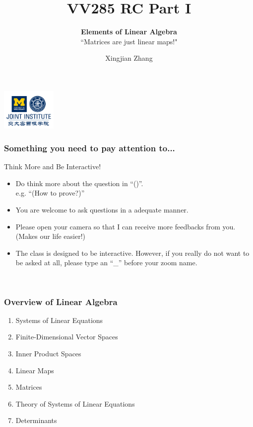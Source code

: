 \documentclass[12pt, t]{beamer}
\title{VV285 RC Part I}
\subtitle{\textbf{Elements of Linear Algebra}\\``Matrices are just linear maps!"}
\institute[UM-SJTU JI]{Univerity of Michigan-Shanghai Jiao Tong University Joint Institute}
\author{Xingjian Zhang}
\begin{document}
\begin{frame}
    \titlepage
    \begin{center}
        \includegraphics[height=2cm]{logo2.png}
    \end{center}
\end{frame}

\begin{frame}
    \frametitle{Something you need to pay attention to...}
    Think More and Be Interactive!
    \begin{itemize}
        \item Do think more about the question in ``()''. \\e.g. ``(How to prove?)''
        \item You are welcome to ask questions in a adequate manner.
        \item Please open your camera so that I can receive more feedbacks from you. (Makes our life easier!) 
        \item The class is designed to be interactive. However, if you really do not want to be asked at all, please type an ``\_'' before your zoom name.
    \end{itemize}
    

\end{frame}

\begin{frame}
    \
    \frametitle{Overview of Linear Algebra}
    \begin{enumerate}
        \item Systems of Linear Equations
        \item Finite-Dimensional Vector Spaces
        \item Inner Product Spaces
        \item Linear Maps
        \item Matrices
        \item Theory of Systems of Linear Equations
        \item Determinants
    \end{enumerate}
\end{frame}
\end{document}
